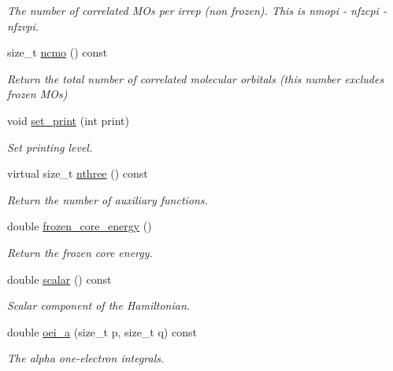 \begin{DoxyCompactItemize}
\begin{DoxyCompactList}\small\item\em The number of correlated M\+Os per irrep (non frozen). This is nmopi -\/ nfzcpi -\/ nfzvpi. \end{DoxyCompactList}\item 
size\+\_\+t \mbox{\hyperlink{classforte_1_1_forte_integrals_a3b78f05526be30dda1653d66f8dfdd74}{ncmo}} () const
\begin{DoxyCompactList}\small\item\em Return the total number of correlated molecular orbitals (this number excludes frozen M\+Os) \end{DoxyCompactList}\item 
void \mbox{\hyperlink{classforte_1_1_forte_integrals_af7a507eef40436e68fff042565249f94}{set\+\_\+print}} (int print)
\begin{DoxyCompactList}\small\item\em Set printing level. \end{DoxyCompactList}\item 
virtual size\+\_\+t \mbox{\hyperlink{classforte_1_1_forte_integrals_af04858e7813556747745f90ffbda81a4}{nthree}} () const
\begin{DoxyCompactList}\small\item\em Return the number of auxiliary functions. \end{DoxyCompactList}\item 
double \mbox{\hyperlink{classforte_1_1_forte_integrals_a3045ecd9722fd7d7544832f7381c5fb3}{frozen\+\_\+core\+\_\+energy}} ()
\begin{DoxyCompactList}\small\item\em Return the frozen core energy. \end{DoxyCompactList}\item 
double \mbox{\hyperlink{classforte_1_1_forte_integrals_a7e2dec148b4e6c3bbd918df8025f8329}{scalar}} () const
\begin{DoxyCompactList}\small\item\em Scalar component of the Hamiltonian. \end{DoxyCompactList}\item 
double \mbox{\hyperlink{classforte_1_1_forte_integrals_adeb8d675248cb181a502818b8a972908}{oei\+\_\+a}} (size\+\_\+t p, size\+\_\+t q) const
\begin{DoxyCompactList}\small\item\em The alpha one-\/electron integrals. \end{DoxyCompactList}\item 

\end{DoxyCompactItemize}
